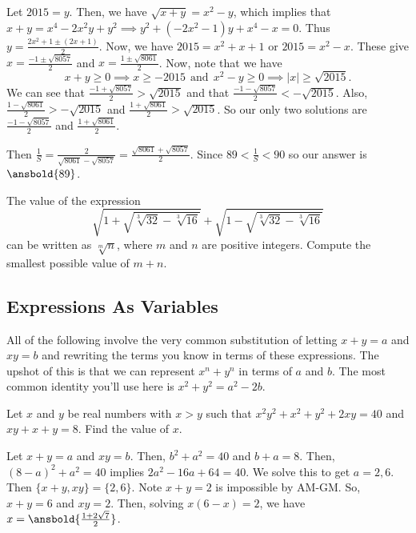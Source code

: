 \documentclass[mast]{lucky}
\begin{document}
\begin{sol}
Let $2015=y$. Then, we have $\sqrt{x+y}=x^2-y$, which implies that $x+y=x^4-2x^2y+y^2\implies y^2+(-2x^2-1)y+x^4-x=0$. Thus $y=\frac{2x^2+1 \pm (2x+1)}{2}$. Now, we have $2015=x^2+x+1$ or $2015=x^2-x$. These give $x=\frac{-1 \pm \sqrt{8057}}{2}$ and $x=\frac{1 \pm \sqrt{8061}}{2}$. Now, note that we have
\[x+y\ge 0 \implies x \ge -2015~~\text{and}~~x^2-y\ge 0\implies |x|\ge \sqrt{2015}.\]
We can see that $\frac{-1 + \sqrt{8057}}{2}>\sqrt{2015}$ and that $\frac{-1-\sqrt{8057}}{2} < -\sqrt{2015}$. Also, $\frac{1-\sqrt{8061}}{2} > - \sqrt{2015}$ and $\frac{1+\sqrt{8061}}{2} > \sqrt{2015}$. So our only two solutions are $\frac{-1-\sqrt{8057}}{2}$ and $\frac{1+\sqrt{8061}}{2}$.

Then $\frac{1}{S}=\frac{2}{\sqrt{8061}-\sqrt{8057}}=\frac{\sqrt{8061}+\sqrt{8057}}{2}$. Since $89 < \frac{1}{S} < 90$ so our answer is $\ansbold{89}$.
\end{sol}

\begin{exam}[NEMO 2017]
The value of the expression
\[\sqrt{1+\sqrt{\sqrt[3]{32}-\sqrt[3]{16}}} + \sqrt{1-\sqrt{\sqrt[3]{32}-\sqrt[3]{16}}}\]
can be written as $\sqrt[m]{n}$, where $m$ and $n$ are positive integers. Compute the smallest possible value of
$m + n$.
\end{exam}

\subsection{Expressions As Variables}

All of the following involve the very common substitution of letting $x+y=a$ and $xy=b$ and rewriting the terms you know in terms of these expressions. The upshot of this is that we can represent $x^{n}+y^{n}$ in terms of $a$ and $b$. The most common identity you'll use here is $x^2+y^2=a^2-2b$.

\begin{exam}
Let $x$ and $y$ be real numbers with $x > y$ such that $x^2 y^2 + x^2 + y^2 + 2xy = 40$ and $xy + x + y = 8$. Find
the value of $x$.
\end{exam}
\begin{sol}
Let $x+y=a$ and $xy=b$. Then, $b^2+a^2=40$ and $b+a=8$. Then, $(8-a)^2+a^2=40$ implies $2a^2-16a+64=40$. We solve this to get $a=2,6$. Then $\{x+y,xy\}=\{2,6\}$. Note $x+y=2$ is impossible by AM-GM. So, $x+y=6$ and $xy=2$. Then, solving $x(6-x)=2$, we have $x=\ansbold{\frac{1+2\sqrt{7}}{2}}$.
\end{sol}
\end{document}
